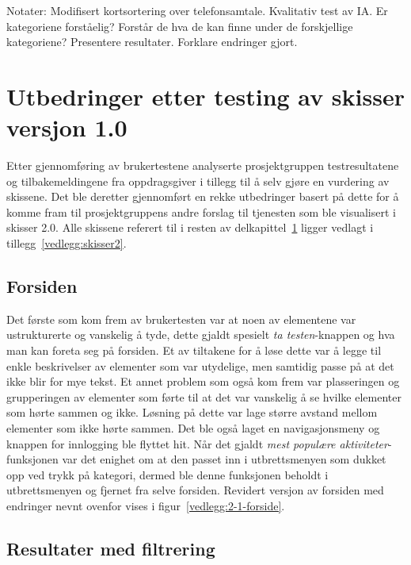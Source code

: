 Notater:
Modifisert kortsortering over telefonsamtale.
Kvalitativ test av IA.
Er kategoriene forståelig? Forstår de hva de kan finne under de forskjellige kategoriene?
Presentere resultater.
Forklare endringer gjort.

\section{Utbedringer etter testing av skisser versjon 1.0}
\label{section:utbedringer-skisser-1}

Etter gjennomføring av brukertestene analyserte prosjektgruppen testresultatene og tilbakemeldingene fra oppdragsgiver i tillegg til å selv gjøre en vurdering av skissene. Det ble deretter gjennomført en rekke utbedringer basert på dette for å komme fram til prosjektgruppens andre forslag til tjenesten som ble visualisert i skisser 2.0. Alle skissene referert til i resten av delkapittel~\ref{section:utbedringer-skisser-1} ligger vedlagt i tillegg~\ref{vedlegg:skisser2}.

\subsection{Forsiden}

Det første som kom frem av brukertesten var at noen av elementene var ustrukturerte og vanskelig å tyde, dette gjaldt spesielt {\em  ta testen}-knappen og hva man kan foreta seg på forsiden. Et av tiltakene for å løse dette var å legge til enkle beskrivelser av elementer som var utydelige, men samtidig passe på at det ikke blir for mye tekst. Et annet problem som også kom frem var plasseringen og grupperingen av elementer som førte til at det var vanskelig å se hvilke elementer som hørte sammen og ikke. Løsning på dette var lage større avstand mellom elementer som ikke hørte sammen. Det ble også laget en navigasjonsmeny og knappen for innlogging ble flyttet hit. Når det gjaldt {\em  mest populære aktiviteter}-funksjonen var det enighet om at den passet inn i utbrettsmenyen som dukket opp ved trykk på kategori, dermed ble denne funksjonen beholdt i utbrettsmenyen og fjernet fra selve forsiden. Revidert versjon av forsiden med endringer nevnt ovenfor vises i figur~\ref{vedlegg:2-1-forside}.

\subsection{Resultater med filtrering}

